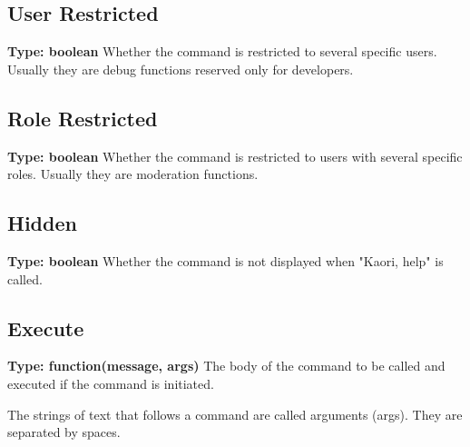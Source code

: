 \documentclass[11pt]{article}
\begin{document}
\subsection{User Restricted}
\textbf{Type: boolean} \hspace{5pt} Whether the command is restricted to several specific users. Usually they are debug functions reserved only for developers.

\subsection{Role Restricted}
\textbf{Type: boolean} \hspace{5pt} Whether the command is restricted to users with several specific roles. Usually they are moderation functions.

\subsection{Hidden}
\textbf{Type: boolean} \hspace{5pt} Whether the command is not displayed when "Kaori, help" is called.



\subsection{Execute}
\textbf{Type: function(message, args)} \hspace{5pt}
The body of the command to be called and executed if the command is initiated.

\medskip

The strings of text that follows a command are called arguments (args). They are separated by spaces. 

\end{document}
